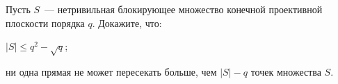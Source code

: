 Пусть $S$~--- нетривильная блокирующее множество конечной проективной плоскости порядка $q$. Докажите,
что:
\begin{enumcyr}
    \item $|S| \le q^2 - \sqrt{q}$;
    \item ни одна прямая не может пересекать больше, чем $|S| - q$ точек множества $S$.
\end{enumcyr}